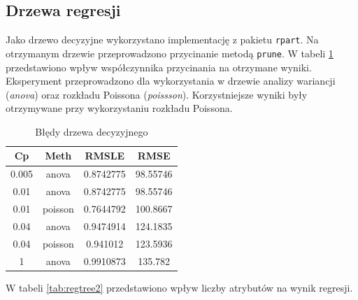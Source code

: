 \documentclass[a4paper,12pt]{article}
\begin{document}
   \subsection{Drzewa regresji}
       Jako drzewo decyzyjne wykorzystano implementację z pakietu \texttt{rpart}. Na otrzymanym drzewie przeprowadzono przycinanie metodą \texttt{prune}.
       W tabeli \ref{tab:regtree1} przedstawiono wpływ współczynnika przycinania na otrzymane wyniki. Eksperyment przeprowadzono dla wykorzystania w drzewie analizy wariancji (\textit{anova}) oraz rozkładu Poissona (\textit{poissson}). Korzystniejsze wyniki były otrzymywane przy wykorzystaniu rozkładu Poissona.
        \begin{table}
        	\centering
            \begin{tabular}{|c|c|c|c|}
                \hline
                Cp & Meth & RMSLE & RMSE \\
                \hline
                0.005 & anova & 0.8742775 & 98.55746 \\
                \hline
                0.01 & anova & 0.8742775 & 98.55746 \\
                \hline
                0.01 & poisson & 0.7644792 & 100.8667 \\
                \hline
                0.04 & anova & 0.9474914 & 124.1835 \\
                \hline
                0.04 & poisson & 0.941012 & 123.5936 \\
                \hline
                1 & anova & 0.9910873 & 135.782 \\
                \hline
            \end{tabular}
            \caption{Błędy drzewa decyzyjnego}
            \label{tab:regtree1}
        \end{table}
        
        W tabeli \ref{tab:regtree2} przedstawiono wpływ liczby atrybutów na wynik regresji.
        
\end{document}
